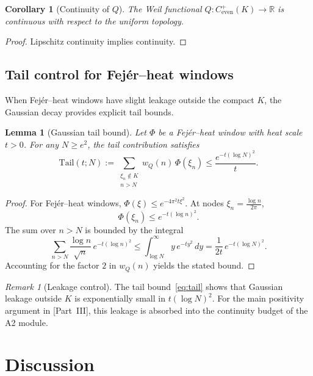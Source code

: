 \documentclass[11pt,a4paper]{article}
\newtheorem{lemma}[theorem]{Lemma}
\newtheorem{corollary}[theorem]{Corollary}
\theoremstyle{definition}
\theoremstyle{remark}
\newtheorem{remark}[theorem]{Remark}
\newcommand{\R}{\mathbb{R}}
\begin{document}
\begin{corollary}[Continuity of $Q$]\label{cor:cont}
The Weil functional $Q : C^+_{\mathrm{even}}(K) \to \R$ is continuous with respect to the uniform topology.
\end{corollary}

\begin{proof}
Lipschitz continuity implies continuity.
\end{proof}

\subsection{Tail control for Fej\'er--heat windows}

When Fej\'er--heat windows have slight leakage outside the compact $K$, the Gaussian decay provides explicit tail bounds.

\begin{lemma}[Gaussian tail bound]\label{lem:tail}
Let $\Phi$ be a Fej\'er--heat window with heat scale $t > 0$. For any $N \geq e^2$, the tail contribution satisfies
\begin{equation}\label{eq:tail}
  \mathrm{Tail}(t; N) := \sum_{\substack{\xi_n \notin K \\ n > N}} w_Q(n)\, \Phi(\xi_n)
  \leq \frac{e^{-t(\log N)^2}}{t}.
\end{equation}
\end{lemma}

\begin{proof}
For Fej\'er--heat windows, $\Phi(\xi) \leq e^{-4\pi^2 t \xi^2}$. At nodes $\xi_n = \frac{\log n}{2\pi}$,
\[
  \Phi(\xi_n) \leq e^{-t(\log n)^2}.
\]
The sum over $n > N$ is bounded by the integral
\[
  \sum_{n > N} \frac{\log n}{\sqrt{n}}\, e^{-t(\log n)^2}
  \leq \int_{\log N}^\infty y\, e^{-ty^2}\, dy
  = \frac{1}{2t}\, e^{-t(\log N)^2}.
\]
Accounting for the factor $2$ in $w_Q(n)$ yields the stated bound.
\end{proof}

\begin{remark}[Leakage control]\label{rem:leakage}
The tail bound~\eqref{eq:tail} shows that Gaussian leakage outside $K$ is exponentially small in $t(\log N)^2$. For the main positivity argument in [Part~III], this leakage is absorbed into the continuity budget of the A2 module.
\end{remark}

\section{Discussion}
\label{sec:discussion}
\end{document}

